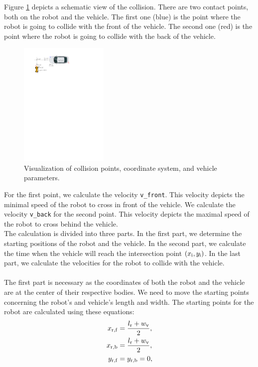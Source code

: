         Figure \ref{fig:collision} depicts a schematic view of the collision. There are two contact points, both on the robot and the vehicle. The first one (blue) is the point where the robot is going to collide with the front of the vehicle. The second one (red) is the point where the robot is going to collide with the back of the vehicle.\\
        \begin{figure}[ht]
            \centering
            \includegraphics[height=6cm]{images/collision.pdf}
            \caption{Visualization of collision points, coordinate system, and vehicle parameters.}
            \label{fig:collision}
        \end{figure}
        \noindent For the first point, we calculate the velocity \texttt{v\_front}. This velocity depicts the minimal speed of the robot to cross in front of the vehicle. We calculate the velocity \texttt{v\_back} for the second point. This velocity depicts the maximal speed of the robot to cross behind the vehicle.\\
        The calculation is divided into three parts. In the first part, we determine the starting positions of the robot and the vehicle. In the second part, we calculate the time when the vehicle will reach the intersection point $(x_{\rm{i}}, y_{\rm{i}})$. In the last part, we calculate the velocities for the robot to collide with the vehicle.\\\\
        The first part is necessary as the coordinates of both the robot and the vehicle are at the center of their respective bodies. We need to move the starting points concerning the robot's and vehicle's length and width. The starting points for the robot are calculated using these equations:
        \begin{align}
            x_{\rm{r,f}} &= \frac{l_{\rm{r}}+w_{\rm{v}}}{2},\\
            x_{\rm{r,b}} &= \frac{l_{\rm{r}}+w_{\rm{v}}}{2},\\
            y_{\rm{r,f}} &= y_{\rm{r,b}} = 0,
        \end{align}
